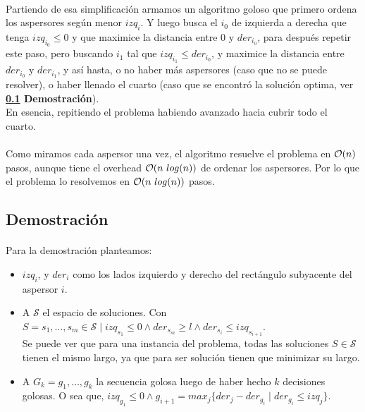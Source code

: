 \documentclass[./main.tex]{subfiles}
\begin{document}

\paragraph{} Partiendo de esa simplificación armamos un algoritmo goloso que primero ordena los aspersores según menor \(izq_i\). Y luego busca el \(i_0\) de izquierda a derecha que tenga \(izq_{i_0} \leq 0\) y que maximice la distancia entre 0 y \(der_{i_0}\), para después repetir este paso, pero buscando \(i_1\) tal que \(izq_{i_1} \leq der_{i_0}\), y maximice la distancia entre \(der_{i_0}\) y \(der_{i_1}\), y así hasta, o no haber más aspersores (caso que no se puede resolver), o haber llenado el cuarto (caso que se encontró la solución optima, ver \textbf{\ref{sec:ej2-dem} Demostración}). \\ %
En esencia, repitiendo el problema habiendo avanzado hacia cubrir todo el cuarto.

\paragraph{} Como miramos cada aspersor una vez, el algoritmo resuelve el problema en \(\mathcal{O}(n)\) pasos, aunque tiene el overhead \(\mathcal{O}(n\ log(n))\) de ordenar los aspersores. Por lo que el problema lo resolvemos en \(\mathcal{O}(n\ log(n))\) pasos. %

\subsection{Demostración}
\label{sec:ej2-dem}

\paragraph{} Para la demostración planteamos:
\begin{itemize}
  \item \(izq_i\), y \(der_i\) como los lados izquierdo y derecho del rectángulo subyacente del aspersor \(i\). %
  \item A \(\mathcal{S}\) el espacio de soluciones. Con \(S = s_1, \ldots, s_m \in \mathcal{S} \mid izq_{s_1} \leq 0 \land der_{s_m} \geq l \land der_{s_i} \leq izq_{s_{i+1}}\). \\
  Se puede ver que para una instancia del problema, todas las soluciones \(S \in \mathcal{S}\) tienen el mismo largo, ya que para ser solución tienen que minimizar su largo. 
  \item A \(G_k = g_1, \ldots, g_k\) la secuencia golosa luego de haber hecho \(k\) decisiones golosas. O sea que, \(izq_{g_1} \leq 0 \land g_{i+1} = max_j\{der_j - der_{g_i} \mid der_{g_i} \leq izq_j\}\).
\end{itemize}
\end{document}
